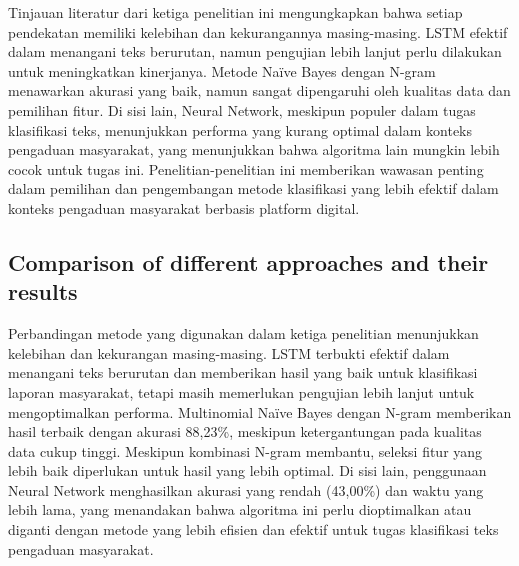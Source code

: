\documentclass[12pt,a4paper]{article}
\begin{document}
\begin{adjustwidth}{3em}{0pt}
\hspace{0.5cm} Tinjauan literatur dari ketiga penelitian ini mengungkapkan bahwa setiap pendekatan memiliki kelebihan dan kekurangannya masing-masing. LSTM efektif dalam menangani teks berurutan, namun pengujian lebih lanjut perlu dilakukan untuk meningkatkan kinerjanya. Metode Naïve Bayes dengan N-gram menawarkan akurasi yang baik, namun sangat dipengaruhi oleh kualitas data dan pemilihan fitur. Di sisi lain, Neural Network, meskipun populer dalam tugas klasifikasi teks, menunjukkan performa yang kurang optimal dalam konteks pengaduan masyarakat, yang menunjukkan bahwa algoritma lain mungkin lebih cocok untuk tugas ini. Penelitian-penelitian ini memberikan wawasan penting dalam pemilihan dan pengembangan metode klasifikasi yang lebih efektif dalam konteks pengaduan masyarakat berbasis platform digital.
\end{adjustwidth}

\subsection{Comparison of different approaches and their results}

\begin{adjustwidth}{3em}{0pt} 
\hspace{0.5cm} Perbandingan metode yang digunakan dalam ketiga penelitian menunjukkan kelebihan dan kekurangan masing-masing. LSTM terbukti efektif dalam menangani teks berurutan dan memberikan hasil yang baik untuk klasifikasi laporan masyarakat, tetapi masih memerlukan pengujian lebih lanjut untuk mengoptimalkan performa. Multinomial Naïve Bayes dengan N-gram memberikan hasil terbaik dengan akurasi 88,23\%, meskipun ketergantungan pada kualitas data cukup tinggi. Meskipun kombinasi N-gram membantu, seleksi fitur yang lebih baik diperlukan untuk hasil yang lebih optimal. Di sisi lain, penggunaan Neural Network menghasilkan akurasi yang rendah (43,00\%) dan waktu yang lebih lama, yang menandakan bahwa algoritma ini perlu dioptimalkan atau diganti dengan metode yang lebih efisien dan efektif untuk tugas klasifikasi teks pengaduan masyarakat.
\end{adjustwidth}
\end{document}
